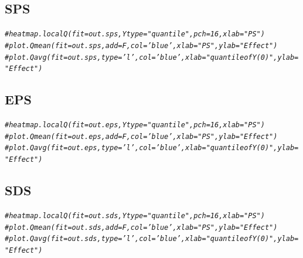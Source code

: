 \documentclass{article}\usepackage[]{graphicx}\usepackage[]{color}
\makeatletter
\newcommand{\hlcom}[1]{\textcolor[rgb]{0.678,0.584,0.686}{\textit{#1}}}%
\newenvironment{kframe}{%
 \def\at@end@of@kframe{}%
 \ifinner\ifhmode%
  \def\at@end@of@kframe{\end{minipage}}%
  \begin{minipage}{\columnwidth}%
 \fi\fi%
 \def\FrameCommand##1{\hskip\@totalleftmargin \hskip-\fboxsep
 \colorbox{shadecolor}{##1}\hskip-\fboxsep
     \hskip-\linewidth \hskip-\@totalleftmargin \hskip\columnwidth}%
 \MakeFramed {\advance\hsize-\width
   \@totalleftmargin\z@ \linewidth\hsize
   \@setminipage}}%
 {\par\unskip\endMakeFramed%
 \at@end@of@kframe}
\newenvironment{knitrout}{}{} %
\makeatother
\begin{document}
\subsection{SPS}
\begin{knitrout}
\color{fgcolor}\begin{kframe}
\begin{alltt}
\hlcom{#heatmap.localQ(fit=out.sps , Ytype="quantile" , pch=16 , xlab="PS")}
\hlcom{#plot.Qmean(fit=out.sps , add=F , col='blue' , xlab="PS" , ylab="Effect")}
\hlcom{#plot.Qavg(fit=out.sps  , type='l' , col='blue' , xlab="quantile of Y(0)" , ylab="Effect")}
\end{alltt}
\end{kframe}
\end{knitrout}
\subsection{EPS}
\begin{knitrout}
\color{fgcolor}\begin{kframe}
\begin{alltt}
\hlcom{#heatmap.localQ(fit=out.eps , Ytype="quantile" , pch=16 , xlab="PS")}
\hlcom{#plot.Qmean(fit=out.eps , add=F , col='blue' , xlab="PS" , ylab="Effect")}
\hlcom{#plot.Qavg(fit=out.eps  , type='l' , col='blue' , xlab="quantile of Y(0)" , ylab="Effect")}
\end{alltt}
\end{kframe}
\end{knitrout}
\subsection{SDS}
\begin{knitrout}
\color{fgcolor}\begin{kframe}
\begin{alltt}
\hlcom{#heatmap.localQ(fit=out.sds , Ytype="quantile" , pch=16 , xlab="PS")}
\hlcom{#plot.Qmean(fit=out.sds , add=F , col='blue' , xlab="PS" , ylab="Effect")}
\hlcom{#plot.Qavg(fit=out.sds  , type='l' , col='blue' , xlab="quantile of Y(0)" , ylab="Effect")}
\end{alltt}
\end{kframe}
\end{knitrout}
\end{document}
